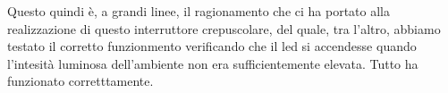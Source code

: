 Questo quindi è, a grandi linee, il ragionamento che ci ha portato alla realizzazione di questo interruttore crepuscolare, del quale, tra l'altro, abbiamo testato il corretto funzionmento verificando che il led si accendesse quando l'intesità luminosa dell'ambiente non era sufficientemente elevata. Tutto ha funzionato corretttamente.

















